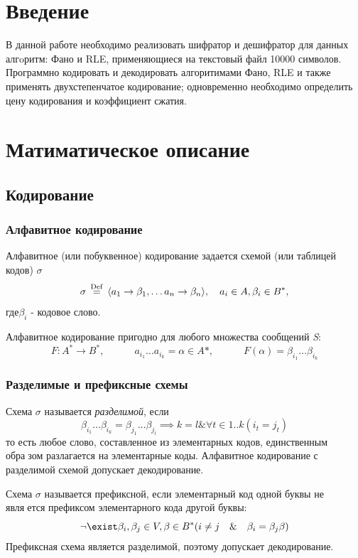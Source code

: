 \documentclass[12pt]{article} %
\newcommand\myeq{\stackrel{\rm Def}{=}}
\begin{document}
\begin{center}

\end{center}
\doublespacing
\tableofcontents
\newpage
\section*{Введение}
	В данной работе необходимо реализовать шифратор и дешифратор для данных алгoритм: Фано и RLE, применяющиеся на текстовый файл 10000 символов. Программно кодировать и декодировать алгоритимами Фано, RLE и также применять двухстепенчатое кодирование; одновременно необходимо определить цену кодирования и коэффициент сжатия. 
\newpage
\section{Матиматическое описание}
\subsection{Кодирование}
\subsubsection{Алфавитное кодирование}
Алфавитное (или побуквенное) кодирование задается схемой (или таблицей кодов) $\sigma$ 
\[ \sigma \,\myeq\, \langle a_1 \rightarrow \beta_1, \dots a_n \rightarrow \beta_n \rangle, \quad a_i \in A, \beta_i \in B^*,\] где$\beta_i $ - кодовое слово. 

Алфавитное кодирование пригодно для любого множества сообщений \textit{S}:
\[ F: A^* \rightarrow B^*,\quad\quad\quad a_{i_1} \dots a_{i_k} = \alpha \in A*, \quad\quad\quad F(\alpha) =\beta_{i_1}\dots\beta_{i_k}\] 
\subsubsection{Разделимые и префиксные схемы}
Схема $\sigma$ называется \textit{разделимой}, если
\[ \beta_{i_1}\dots\beta_{i_k} = \beta_{j_1}\dots\beta_{j_l} \implies k= l \& \forall t\in 1..k (i_t = j_t)\]
то есть любое слово, составленное из элементарных кодов, единственным образом разлагается на элементарные коды. Алфавитное кодирование с разделимой схемой допускает декодирование.

Схема $\sigma$ называется префиксной, если элементарный код одной буквы не является префиксом элементарного кода другой буквы: 
\[ \neg \exist \beta_i , \beta_j \in V, \beta \in B^* (i\neq j \quad\&\quad \beta_i = \beta_j\beta)\]
Префиксная схема является разделимой, поэтому допускает декодирование. 
\end{document}
